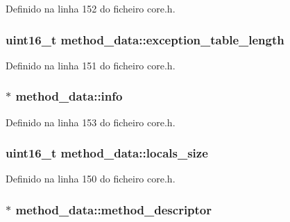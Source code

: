 Definido na linha 152 do ficheiro core.\-h.

\hypertarget{structmethod__data_ac5f08aab5ad351365c25e550c4a0bfb3}{
\subsubsection[{exception\-\_\-table\-\_\-length}]{\setlength{\rightskip}{0pt plus 5cm}uint16\-\_\-t method\-\_\-data\-::exception\-\_\-table\-\_\-length}}\label{structmethod__data_ac5f08aab5ad351365c25e550c4a0bfb3}


Definido na linha 151 do ficheiro core.\-h.

\hypertarget{structmethod__data_ae433725619fdadbb915ae3f51198208b}{
\subsubsection[{info}]{$\ast$ method\-\_\-data\-::info}}\label{structmethod__data_ae433725619fdadbb915ae3f51198208b}


Definido na linha 153 do ficheiro core.\-h.

\hypertarget{structmethod__data_a09b30df4053904e1ebe666ae1ccc45d4}{
\subsubsection[{locals\-\_\-size}]{\setlength{\rightskip}{0pt plus 5cm}uint16\-\_\-t method\-\_\-data\-::locals\-\_\-size}}\label{structmethod__data_a09b30df4053904e1ebe666ae1ccc45d4}


Definido na linha 150 do ficheiro core.\-h.

\hypertarget{structmethod__data_ae4a01197c105855d2e337fb8875358a8}{
\subsubsection[{method\-\_\-descriptor}]{$\ast$ method\-\_\-data\-::method\-\_\-descriptor}}\label{structmethod__data_ae4a01197c105855d2e337fb8875358a8}


